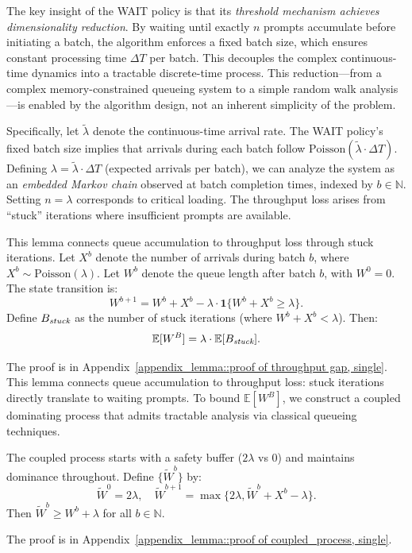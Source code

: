 The key insight of the WAIT policy is that its \emph{threshold mechanism achieves dimensionality reduction}. By waiting until exactly $n$ prompts accumulate before initiating a batch, the algorithm enforces a fixed batch size, which ensures constant processing time $\Delta T$ per batch. This decouples the complex continuous-time dynamics into a tractable discrete-time process. This reduction---from a complex memory-constrained queueing system to a simple random walk analysis---is enabled by the algorithm design, not an inherent simplicity of the problem.

Specifically, let $\tilde{\lambda}$ denote the continuous-time arrival rate. The WAIT policy's fixed batch size implies that arrivals during each batch follow $\text{Poisson}(\tilde{\lambda} \cdot \Delta T)$. Defining $\lambda = \tilde{\lambda} \cdot \Delta T$ (expected arrivals per batch), we can analyze the system as an \emph{embedded Markov chain} observed at batch completion times, indexed by $b \in \mathbb{N}$. Setting $n = \lambda$ corresponds to critical loading. The throughput loss arises from ``stuck'' iterations where insufficient prompts are available.

\begin{lemma}\label{lemma::throughput gap, single}
This lemma connects queue accumulation to throughput loss through stuck iterations. Let $X^b$ denote the number of arrivals during batch $b$, where $X^b \sim \text{Poisson}(\lambda)$. Let $W^b$ denote the queue length after batch $b$, with $W^0=0$. The state transition is:
$$W^{b+1}=W^b+X^b-\lambda\cdot \mathbf{1}\{W^b+X^b\geq \lambda\}.$$
Define $B_{\emph{stuck}}$ as the number of stuck iterations (where $W^b+X^b<\lambda$). Then:
$$\mathbb{E}[W^B]= \lambda\cdot\mathbb{E}[B_{\emph{stuck}}].$$
\end{lemma}
\noindent The proof is in Appendix~\ref{appendix_lemma::proof of throughput gap, single}. This lemma connects queue accumulation to throughput loss: stuck iterations directly translate to waiting prompts. To bound $\mathbb{E}[W^B]$, we construct a coupled dominating process that admits tractable analysis via classical queueing techniques.

\begin{lemma}\label{lem:coupled_process, single}
The coupled process starts with a safety buffer ($2\lambda$ vs 0) and maintains dominance throughout. Define $\{\tilde{W}^b\}$ by:
$$
\tilde{W}^0 = 2\lambda, \quad \tilde{W}^{b+1} = \max\{ 2\lambda, \tilde{W}^b + X^b - \lambda \}.
$$
Then $\tilde{W}^b \geq W^b + \lambda$ for all $b\in \mathbb{N}$.
\end{lemma}
\noindent The proof is in Appendix~\ref{appendix_lemma::proof of coupled_process, single}.

